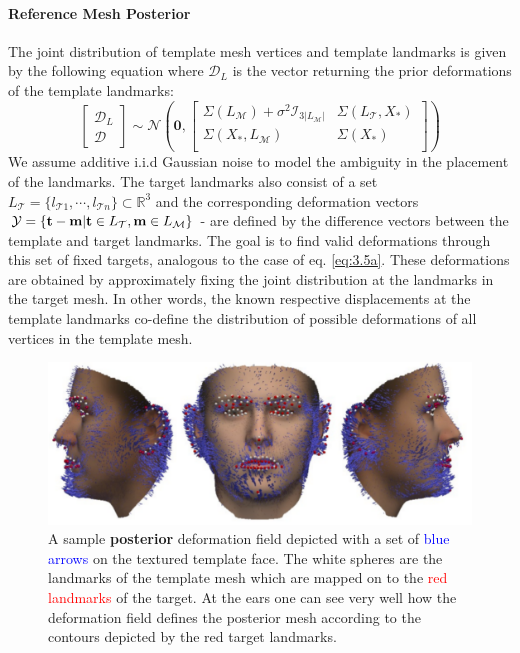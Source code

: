 \paragraph{Reference Mesh Posterior}
The joint distribution of template mesh vertices and template landmarks is given by the following equation where $\mathcal{D}_{L}$ is the vector returning the prior deformations of the template landmarks: 
\begin{equation}
    \begin{bmatrix}\mathcal{D}_{L}\\\mathcal{D}\end{bmatrix}
\sim \mathcal{N}\left(\textbf{0},
\begin{bmatrix}
    \Sigma(L_{\mathcal{M}}) + \sigma^2\mathcal{I}_{3\left|L_{\mathcal{M}} \right|} & \Sigma(L_{\mathcal{T}},X_{*})\\
    \Sigma(X_{*},L_{\mathcal{M}}) & \Sigma(X_{*})\\
\end{bmatrix}
\right)
\label{eq:3Djointdist}
\end{equation}
We assume additive i.i.d Gaussian noise to model the ambiguity in the placement of the landmarks. The target landmarks also consist of a set $L_{\mathcal{T}} = \{l_{\mathcal{T}1},\cdots, l_{\mathcal{T}n}\} \subset \mathbb{R}^3$ and the corresponding deformation vectors $\mathcal{Y}=\{\textbf{t}-\textbf{m}\vert \textbf{t} \in L_{\mathcal{T}}, \textbf{m} \in L_{\mathcal{M}}\}$ - are defined by the difference vectors between the template and target landmarks. The goal is to find valid
deformations through this set of fixed targets, analogous to the case of eq. \ref{eq:3.5a}. These deformations are obtained by approximately fixing the joint distribution at the landmarks in the target mesh. In other words, the known respective displacements at the template landmarks co-define the distribution of possible deformations of all vertices in the template mesh.
\begin{figure}[h!]
    \includegraphics[width=\textwidth]{./resources/img/posterior_deformations.pdf}
    \caption{A sample \textbf{posterior} deformation field depicted with a set of \textcolor{blue}{blue arrows} on the textured template face. The white spheres are the landmarks of the template mesh which are mapped on to the \textcolor{red}{red landmarks} of the target. At the ears one can see very well how the deformation field defines the posterior mesh according to the contours depicted by the red target landmarks.}
\label{fig:posteriordeformations}
\end{figure}
